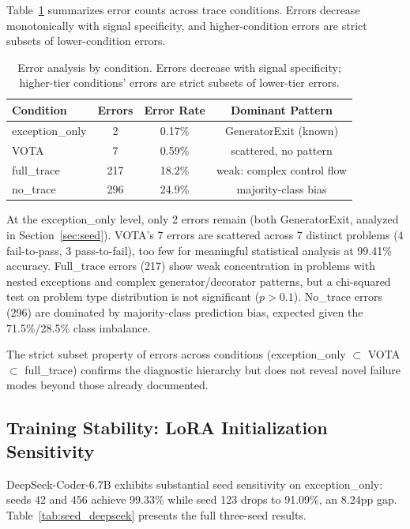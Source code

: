 \documentclass[11pt]{article}
\begin{document}
Table~\ref{tab:errors} summarizes error counts across trace conditions. Errors decrease monotonically with signal specificity, and higher-condition errors are strict subsets of lower-condition errors.

\begin{table}[t]
\centering
\caption{Error analysis by condition. Errors decrease with signal specificity; higher-tier conditions' errors are strict subsets of lower-tier errors.}
\label{tab:errors}
\begin{tabular}{lccc}
\toprule
Condition & Errors & Error Rate & Dominant Pattern \\
\midrule
exception\_only & 2 & 0.17\% & GeneratorExit (known) \\
VOTA & 7 & 0.59\% & scattered, no pattern \\
full\_trace & 217 & 18.2\% & weak: complex control flow \\
no\_trace & 296 & 24.9\% & majority-class bias \\
\bottomrule
\end{tabular}
\end{table}

At the exception\_only level, only 2 errors remain (both GeneratorExit, analyzed in Section~\ref{sec:seed}). VOTA's 7 errors are scattered across 7 distinct problems (4 fail-to-pass, 3 pass-to-fail), too few for meaningful statistical analysis at 99.41\% accuracy. Full\_trace errors (217) show weak concentration in problems with nested exceptions and complex generator/decorator patterns, but a chi-squared test on problem type distribution is not significant ($p > 0.1$). No\_trace errors (296) are dominated by majority-class prediction bias, expected given the 71.5\%/28.5\% class imbalance.

The strict subset property of errors across conditions (exception\_only $\subset$ VOTA $\subset$ full\_trace) confirms the diagnostic hierarchy but does not reveal novel failure modes beyond those already documented.

\subsection{Training Stability: LoRA Initialization Sensitivity}
\label{sec:training_stability}

DeepSeek-Coder-6.7B exhibits substantial seed sensitivity on exception\_only: seeds 42 and 456 achieve 99.33\% while seed 123 drops to 91.09\%, an 8.24pp gap. Table~\ref{tab:seed_deepseek} presents the full three-seed results.
\end{document}
